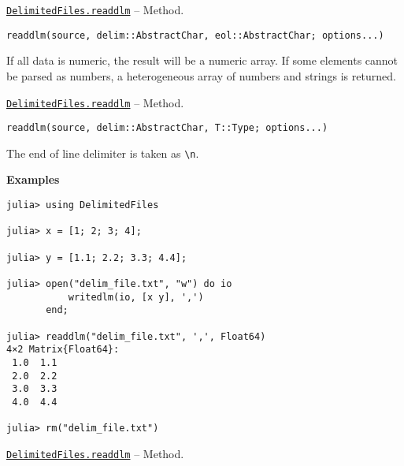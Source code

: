 \hypertarget{1603601005462297621}{}
\hyperlink{1603601005462297621}{\texttt{DelimitedFiles.readdlm}}  -- {Method.}

\begin{adjustwidth}{2em}{0pt}


\begin{verbatim}
readdlm(source, delim::AbstractChar, eol::AbstractChar; options...)
\end{verbatim}

If all data is numeric, the result will be a numeric array. If some elements cannot be parsed as numbers, a heterogeneous array of numbers and strings is returned.



\end{adjustwidth}
\hypertarget{5009151353507840926}{}
\hyperlink{5009151353507840926}{\texttt{DelimitedFiles.readdlm}}  -- {Method.}

\begin{adjustwidth}{2em}{0pt}


\begin{verbatim}
readdlm(source, delim::AbstractChar, T::Type; options...)
\end{verbatim}

The end of line delimiter is taken as \texttt{{\textbackslash}n}.

\textbf{Examples}


\begin{verbatim}
julia> using DelimitedFiles

julia> x = [1; 2; 3; 4];

julia> y = [1.1; 2.2; 3.3; 4.4];

julia> open("delim_file.txt", "w") do io
           writedlm(io, [x y], ',')
       end;

julia> readdlm("delim_file.txt", ',', Float64)
4×2 Matrix{Float64}:
 1.0  1.1
 2.0  2.2
 3.0  3.3
 4.0  4.4

julia> rm("delim_file.txt")
\end{verbatim}



\end{adjustwidth}
\hypertarget{9521030263096731758}{}
\hyperlink{9521030263096731758}{\texttt{DelimitedFiles.readdlm}}  -- {Method.}

